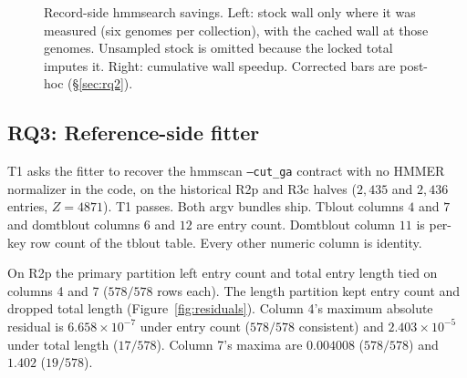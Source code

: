 \documentclass[letterpaper,twocolumn,10pt]{article}
\begin{document}
\begin{figure}[t]
\centering

\caption{Record-side hmmsearch savings.
Left: stock wall only where it was measured (six genomes per collection), with the cached wall at those genomes.
Unsampled stock is omitted because the locked total imputes it.
Right: cumulative wall speedup.
Corrected bars are post-hoc (\S\ref{sec:rq2}).}
\label{fig:savings}
\end{figure}

\subsection{RQ3: Reference-side fitter}
\label{sec:rq3}

T1 asks the fitter to recover the hmmscan \texttt{--cut\_ga} contract with no HMMER normalizer in the code, on the historical R2p and R3c halves
($2{,}435$ and $2{,}436$ entries,
$Z = 4871$).
T1 passes.
Both argv bundles ship.
Tblout columns
$4$ and $7$
and domtblout columns
$6$ and $12$
are entry count.
Domtblout column
$11$
is per-key row count of the tblout table.
Every other numeric column is identity.

On R2p the primary partition left entry count and total entry length tied on columns 4 and 7
($578/578$ rows each).
The length partition kept entry count and dropped total length (Figure~\ref{fig:residuals}).
Column 4's maximum absolute residual is
$6.658\times 10^{-7}$
under entry count
($578/578$ consistent)
and
$2.403\times 10^{-5}$
under total length
($17/578$).
Column 7's maxima are
$0.004008$
($578/578$)
and
$1.402$
($19/578$).
\end{document}
